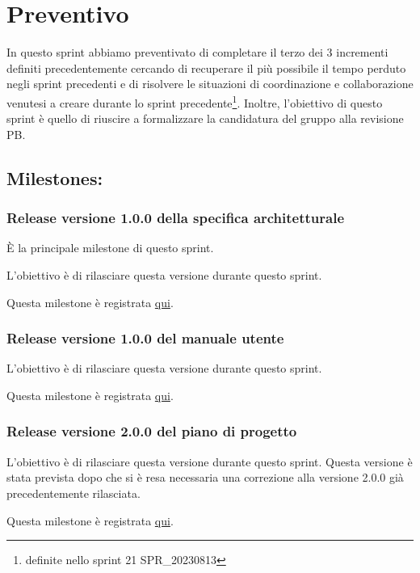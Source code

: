 \section{Preventivo}

In questo sprint abbiamo preventivato di completare il terzo dei 3 incrementi definiti precedentemente cercando di recuperare il più possibile il tempo perduto negli sprint precedenti e di risolvere le situazioni di coordinazione e collaborazione venutesi a creare durante lo sprint precedente\footnote{definite nello sprint 21 SPR\_20230813}. Inoltre, l'obiettivo di questo sprint è quello di riuscire a formalizzare la candidatura del gruppo alla revisione PB.

\subsection{Milestones:}  

\subsubsection{Release versione 1.0.0 della specifica architetturale}

È la principale milestone di questo sprint.

L'obiettivo è di rilasciare questa versione durante questo sprint.

Questa milestone è registrata \href{https://github.com/SWEasabi/specifica-architetturale/milestone/1}{qui}.

\subsubsection{Release versione 1.0.0 del manuale utente}

L'obiettivo è di rilasciare questa versione durante questo sprint.

Questa milestone è registrata \href{https://github.com/SWEasabi/manuale-utente/milestone/1}{qui}.

\subsubsection{Release versione 2.0.0 del piano di progetto}

L'obiettivo è di rilasciare questa versione durante questo sprint.
Questa versione è stata prevista dopo che si è resa necessaria una correzione alla versione 2.0.0 già precedentemente rilasciata.

Questa milestone è registrata \href{https://github.com/SWEasabi/piano-di-progetto/milestone/4}{qui}.

